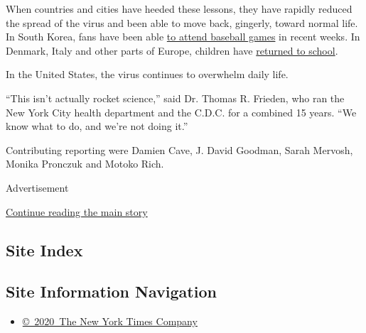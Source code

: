 When countries and cities have heeded these lessons, they have rapidly
reduced the spread of the virus and been able to move back, gingerly,
toward normal life. In South Korea, fans have been able
\href{https://time.com/5871901/south-korea-baseball-coronavirus/}{to
attend baseball games} in recent weeks. In Denmark, Italy and other
parts of Europe, children have
\href{https://www.sciencemag.org/news/2020/07/school-openings-across-globe-suggest-ways-keep-coronavirus-bay-despite-outbreaks}{returned
to school}.

In the United States, the virus continues to overwhelm daily life.

``This isn't actually rocket science,'' said Dr. Thomas R. Frieden, who
ran the New York City health department and the C.D.C. for a combined 15
years. ``We know what to do, and we're not doing it.''

Contributing reporting were Damien Cave, J. David Goodman, Sarah
Mervosh, Monika Pronczuk and Motoko Rich.

Advertisement

\protect\hyperlink{after-bottom}{Continue reading the main story}

\hypertarget{site-index}{%
\subsection{Site Index}\label{site-index}}

\hypertarget{site-information-navigation}{%
\subsection{Site Information
Navigation}\label{site-information-navigation}}

\begin{itemize}
\tightlist
\item
  \href{https://help.nytimes.com/hc/en-us/articles/115014792127-Copyright-notice}{©~2020~The
  New York Times Company}
\end{itemize}

